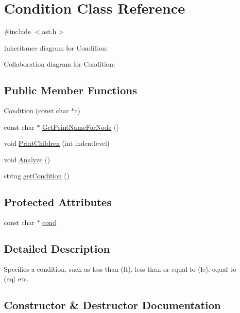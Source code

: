 \hypertarget{class_condition}{}\section{Condition Class Reference}
\label{class_condition}


{\ttfamily \#include $<$ast.\+h$>$}



Inheritance diagram for Condition\+:


Collaboration diagram for Condition\+:
\subsection*{Public Member Functions}
\begin{DoxyCompactItemize}
\item 
\hyperlink{class_condition_a3f530196d48c1ee077022837cd203ce6}{Condition} (const char $\ast$c)
\item 
const char $\ast$ \hyperlink{class_condition_aafdb69783f81fa13cfdc8896bbd34095}{Get\+Print\+Name\+For\+Node} ()
\item 
void \hyperlink{class_condition_abdf41362b3b1f8a2fdeb290d657928a2}{Print\+Children} (int indentlevel)
\item 
void \hyperlink{class_condition_a899d0ab9bddcbe9f23bf0c8af84d7d10}{Analyze} ()
\item 
string \hyperlink{class_condition_a2089bf7976fb6f35a8c926d3c5722cc7}{get\+Condition} ()
\end{DoxyCompactItemize}
\subsection*{Protected Attributes}
\begin{DoxyCompactItemize}
\item 
const char $\ast$ \hyperlink{class_condition_ac943c2c4b15adc82cb31b9f02c61b8a3}{cond}
\end{DoxyCompactItemize}


\subsection{Detailed Description}
Specifies a condition, such as less than (lt), less than or equal to (le), equal to (eq) etc. 

\subsection{Constructor \& Destructor Documentation}
\mbox{\label{class_condition_a3f530196d48c1ee077022837cd203ce6}} 
